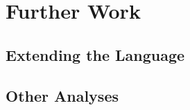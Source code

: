 \documentclass[11pt,a4paper]{article}
\begin{document}
\section{Further Work}

\subsection{Extending the Language}

\subsection{Other Analyses}


{}
\end{document}
